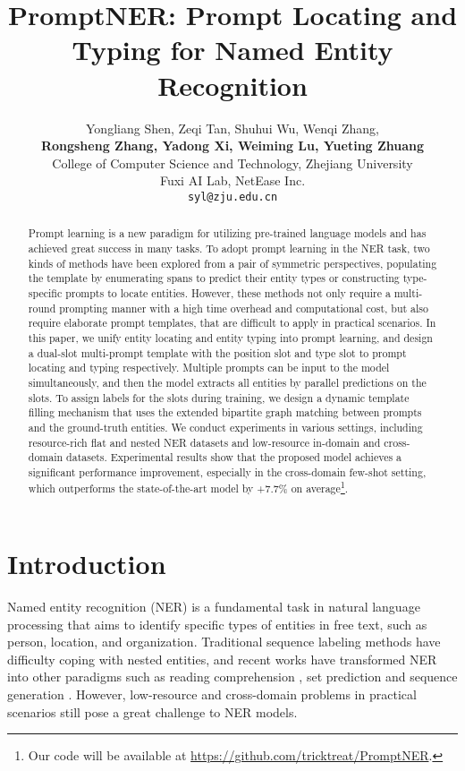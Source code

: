 \documentclass[11pt]{article}
\title{PromptNER: Prompt Locating and Typing for Named Entity Recognition}
\author{
Yongliang Shen, Zeqi Tan, Shuhui Wu, Wenqi Zhang,\\ 
\textbf{Rongsheng Zhang, Yadong Xi, Weiming Lu, Yueting Zhuang}\\
College of Computer Science and Technology, Zhejiang University \\
Fuxi AI Lab, NetEase Inc.\\
\texttt{syl@zju.edu.cn}
}
\begin{document}
\maketitle
\renewcommand{\thefootnote}{\fnsymbol{footnote}}
\renewcommand{\thefootnote}{\arabic{footnote}}

\begin{abstract}

Prompt learning is a new paradigm for utilizing pre-trained language models and has achieved great success in many tasks. To adopt prompt learning in the NER task, two kinds of methods have been explored from a pair of symmetric perspectives, populating the template by enumerating spans to predict their entity types or constructing type-specific prompts to locate entities. However, these methods not only require a multi-round prompting manner with a high time overhead and computational cost, but also require elaborate prompt templates, that are difficult to apply in practical scenarios. In this paper, we unify entity locating and entity typing into prompt learning, and design a dual-slot multi-prompt template with the position slot and type slot to prompt locating and typing respectively. Multiple prompts can be input to the model simultaneously, and then the model extracts all entities by parallel predictions on the slots. To assign labels for the slots during training, we design a dynamic template filling mechanism that uses the extended bipartite graph matching between prompts and the ground-truth entities. We conduct experiments in various settings, including resource-rich flat and nested NER datasets and low-resource in-domain and cross-domain datasets. Experimental results show that the proposed model achieves a significant performance improvement, especially in the cross-domain few-shot setting, which outperforms the state-of-the-art model by +7.7\% on average\footnote{\;Our code will be available at \url{https://github.com/tricktreat/PromptNER}.}.


\end{abstract}

\section{Introduction}

Named entity recognition (NER) is a fundamental task in natural language processing that aims to identify specific types of entities in free text, such as person, location, and organization.
Traditional sequence labeling methods \citep{ma-hovy-2016-end} have difficulty coping with nested entities, and recent works have transformed NER into other paradigms such as reading comprehension \citep{li-etal-2020-unified, shen-etal-2022-parallel}, set prediction \citep{ijcai2021-542, ijcai2022-0613} and sequence generation \citep{tanl,yan-etal-2021-unified-generative,lu-etal-2022-unified}. However, low-resource and cross-domain problems in practical scenarios still pose a great challenge to NER models.
\end{document}
